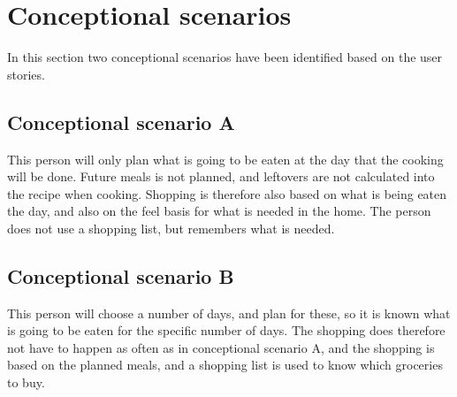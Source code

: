 \section{Conceptional scenarios}

In this section two conceptional scenarios have been identified based on the user stories.

\subsection{Conceptional scenario A} \label{ConceptionalScenarioA}
This person will only plan what is going to be eaten at the day that the cooking will be done. Future meals is not planned, and leftovers are not calculated into the recipe when cooking.
Shopping is therefore also based on what is being eaten the day, and also on the feel basis for what is needed in the home. The person does not use a shopping list, but remembers what is needed.

\subsection{Conceptional scenario B} \label{ConceptionalScenarioB}
This person will choose a number of days, and plan for these, so it is known what is going to be eaten for the specific number of days. The shopping does therefore not have to happen as often as in conceptional scenario A, and the shopping is based on the planned meals, and a shopping list is used to know which groceries to buy. 